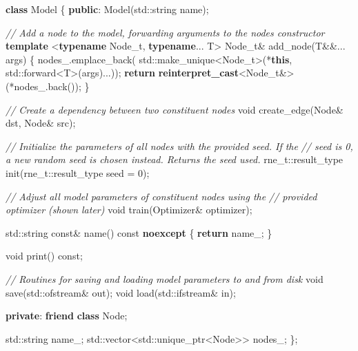 \documentclass[
]{article}
\newenvironment{Shaded}{}{}
\newcommand{\AttributeTok}[1]{\textcolor[rgb]{0.49,0.56,0.16}{#1}}
\newcommand{\BuiltInTok}[1]{#1}
\newcommand{\CommentTok}[1]{\textcolor[rgb]{0.38,0.63,0.69}{\textit{#1}}}
\newcommand{\ControlFlowTok}[1]{\textcolor[rgb]{0.00,0.44,0.13}{\textbf{#1}}}
\newcommand{\DataTypeTok}[1]{\textcolor[rgb]{0.56,0.13,0.00}{#1}}
\newcommand{\DecValTok}[1]{\textcolor[rgb]{0.25,0.63,0.44}{#1}}
\newcommand{\KeywordTok}[1]{\textcolor[rgb]{0.00,0.44,0.13}{\textbf{#1}}}
\newcommand{\NormalTok}[1]{#1}
\newcommand{\VariableTok}[1]{\textcolor[rgb]{0.10,0.09,0.49}{#1}}
\begin{document}
\begin{Shaded}
\begin{Highlighting}[]
\KeywordTok{class}\NormalTok{ Model}
\NormalTok{\{}
\KeywordTok{public}\NormalTok{:}
\NormalTok{    Model(}\BuiltInTok{std::}\NormalTok{string name);}
    
    \CommentTok{// Add a node to the model, forwarding arguments to the node\textquotesingle{}s constructor}
    \KeywordTok{template}\NormalTok{ \textless{}}\KeywordTok{typename} \DataTypeTok{Node\_t}\NormalTok{, }\KeywordTok{typename}\NormalTok{... T\textgreater{}}
    \DataTypeTok{Node\_t}\NormalTok{\& add\_node(T\&\&... args)}
\NormalTok{    \{}
        \VariableTok{nodes\_}\NormalTok{.emplace\_back(}
            \BuiltInTok{std::}\NormalTok{make\_unique\textless{}}\DataTypeTok{Node\_t}\NormalTok{\textgreater{}(*}\KeywordTok{this}\NormalTok{, }\BuiltInTok{std::}\NormalTok{forward\textless{}T\textgreater{}(args)...));}
        \ControlFlowTok{return} \KeywordTok{reinterpret\_cast}\NormalTok{\textless{}}\DataTypeTok{Node\_t}\NormalTok{\&\textgreater{}(*}\VariableTok{nodes\_}\NormalTok{.back());}
\NormalTok{    \}}

    \CommentTok{// Create a dependency between two constituent nodes}
    \DataTypeTok{void}\NormalTok{ create\_edge(Node\& dst, Node\& src);}

    \CommentTok{// Initialize the parameters of all nodes with the provided seed. If the}
    \CommentTok{// seed is 0, a new random seed is chosen instead. Returns the seed used.}
    \DataTypeTok{rne\_t}\NormalTok{::}\DataTypeTok{result\_type}\NormalTok{ init(}\DataTypeTok{rne\_t}\NormalTok{::}\DataTypeTok{result\_type}\NormalTok{ seed = }\DecValTok{0}\NormalTok{);}

    \CommentTok{// Adjust all model parameters of constituent nodes using the}
    \CommentTok{// provided optimizer (shown later)}
    \DataTypeTok{void}\NormalTok{ train(Optimizer\& optimizer);}

    \BuiltInTok{std::}\NormalTok{string }\AttributeTok{const}\NormalTok{\& name() }\AttributeTok{const} \KeywordTok{noexcept}
\NormalTok{    \{}
        \ControlFlowTok{return} \VariableTok{name\_}\NormalTok{;}
\NormalTok{    \}}

    \DataTypeTok{void}\NormalTok{ print() }\AttributeTok{const}\NormalTok{;}

    \CommentTok{// Routines for saving and loading model parameters to and from disk}
    \DataTypeTok{void}\NormalTok{ save(}\BuiltInTok{std::}\NormalTok{ofstream\& out);}
    \DataTypeTok{void}\NormalTok{ load(}\BuiltInTok{std::}\NormalTok{ifstream\& in);}

\KeywordTok{private}\NormalTok{:}
    \KeywordTok{friend} \KeywordTok{class}\NormalTok{ Node;}

    \BuiltInTok{std::}\NormalTok{string }\VariableTok{name\_}\NormalTok{;}
    \BuiltInTok{std::}\NormalTok{vector\textless{}}\BuiltInTok{std::}\NormalTok{unique\_ptr\textless{}Node\textgreater{}\textgreater{} }\VariableTok{nodes\_}\NormalTok{;}
\NormalTok{\};}
\end{Highlighting}
\end{Shaded}
\end{document}
